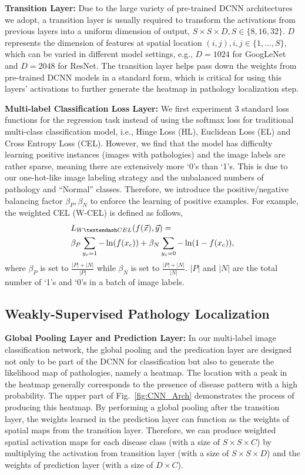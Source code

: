 \documentclass[10pt,twocolumn,letterpaper]{article}
\begin{document}
{\bf Transition Layer:}
Due to the large variety of pre-trained DCNN architectures we adopt, a transition layer is usually required to transform the activations from previous layers into a uniform dimension of output, $S\times S \times D, S\in\{8,16,32\}$. $D$ represents the dimension of features at spatial location $(i,j), i,j \in\{1,...,S\}$, which can be varied in different model settings, e.g., $D=1024$ for GoogLeNet and $D=2048$ for ResNet. The transition layer helps pass down the weights from pre-trained DCNN models in a standard form, which is critical for using this layers' activations to further generate the heatmap in pathology localization step. 

{\bf Multi-label Classification Loss Layer:}
We first experiment 3 standard loss functions for the regression task instead of using the softmax loss for traditional multi-class classification model, i.e., Hinge Loss (HL), Euclidean Loss (EL) and Cross Entropy Loss (CEL). However, we find that the model has difficulty learning positive instances (images with pathologies) and the image labels are rather sparse, meaning there are extensively more `0's than `1's. This is due to our one-hot-like image labeling strategy and the unbalanced numbers of pathology and ``Normal'' classes. Therefore, we introduce the positive/negative balancing factor $\beta_{P},\beta_{N}$ to enforce the learning of positive examples. For example, the weighted CEL (W-CEL) is defined as follows,
\begin{equation}
\begin{split}
&L_{W\textendash CEL} (f(\vec{x}),\vec{y})=\\
&\beta_{P}\sum_{y_{c}=1}-\ln(f(x_{c}))+ \beta_{N}\sum_{y_{c}=0}-\ln(1-f(x_{c})),  
\end{split} \label{eq:balanced}
\end{equation}
where $\beta_{P}$ is set to $\frac{|P|+|N|}{|P|}$ while $\beta_{N}$ is set to $\frac{|P|+|N|}{|N|}$. $|P|$ and $|N|$ are the total number of `1's and `0's in a batch of image labels.

\subsection{Weakly-Supervised Pathology Localization}
{\bf Global Pooling Layer and Prediction Layer:}
In our multi-label image classification network, the global pooling and the predication layer are designed not only to be part of the DCNN for classification but also to generate the likelihood map of pathologies, namely a heatmap. The location with a peak in the heatmap generally corresponds to the presence of disease pattern with a high probability. The upper part of Fig.~\ref{fig:CNN_Arch} demonstrates the process of producing this heatmap. By performing a global pooling after the transition layer, the weights learned in the prediction layer can function as the weights of spatial maps from the transition layer. Therefore, we can produce weighted spatial activation maps for each disease class (with a size of $S\times S \times C$) by multiplying the activation from transition layer (with a size of $S\times S \times D$) and the weights of prediction layer (with a size of $D\times C$).
\end{document}

